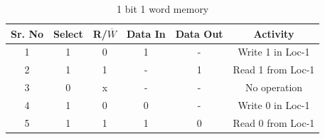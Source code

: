 \documentclass[a4paper]{article}
\begin{document}
\begin{table}[h!]
    \begin{center}
        \begin{tabular}{|c|c|c|c|c|c|}
            \hline
            \textbf{Sr. No} & \textbf{Select} & \textbf{R/$\overline{W}$} & \textbf{Data In} & \textbf{Data Out} & \textbf{Activity} \\
            \hline
            1               & 1               & 0                         & 1                & -                 & Write 1 in Loc-1  \\
            2               & 1               & 1                         & -                & 1                 & Read 1 from Loc-1 \\
            3               & 0               & x                         & -                & -                 & No operation      \\
            4               & 1               & 0                         & 0                & -                 & Write 0 in Loc-1  \\
            5               & 1               & 1                         & 1                & 0                 & Read 0 from Loc-1 \\
            \hline
        \end{tabular}
        \label{tab:1b1w}
        \caption{1 bit 1 word memory}
    \end{center}
\end{table}
\end{document}
